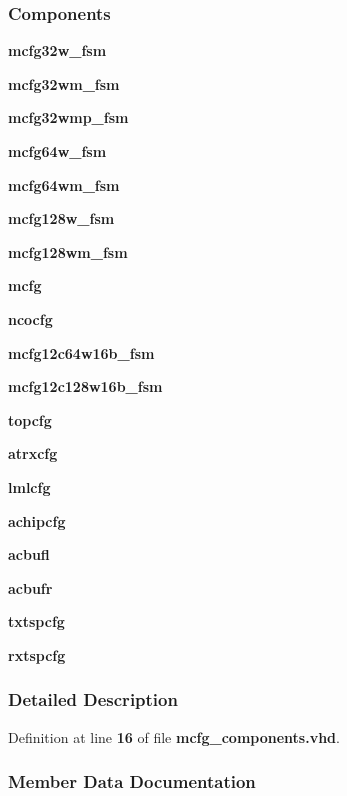 \subsubsection*{Components}
 \begin{DoxyCompactItemize}
\item 
{\bf mcfg32w\+\_\+fsm}  {\bfseries }  
\item 
{\bf mcfg32wm\+\_\+fsm}  {\bfseries }  
\item 
{\bf mcfg32wmp\+\_\+fsm}  {\bfseries }  
\item 
{\bf mcfg64w\+\_\+fsm}  {\bfseries }  
\item 
{\bf mcfg64wm\+\_\+fsm}  {\bfseries }  
\item 
{\bf mcfg128w\+\_\+fsm}  {\bfseries }  
\item 
{\bf mcfg128wm\+\_\+fsm}  {\bfseries }  
\item 
{\bf mcfg}  {\bfseries }  
\item 
{\bf ncocfg}  {\bfseries }  
\item 
{\bf mcfg12c64w16b\+\_\+fsm}  {\bfseries }  
\item 
{\bf mcfg12c128w16b\+\_\+fsm}  {\bfseries }  
\item 
{\bf topcfg}  {\bfseries }  
\item 
{\bf atrxcfg}  {\bfseries }  
\item 
{\bf lmlcfg}  {\bfseries }  
\item 
{\bf achipcfg}  {\bfseries }  
\item 
{\bf acbufl}  {\bfseries }  
\item 
{\bf acbufr}  {\bfseries }  
\item 
{\bf txtspcfg}  {\bfseries }  
\item 
{\bf rxtspcfg}  {\bfseries }  
\end{DoxyCompactItemize}


\subsubsection{Detailed Description}


Definition at line {\bf 16} of file {\bf mcfg\+\_\+components.\+vhd}.



\subsubsection{Member Data Documentation}
